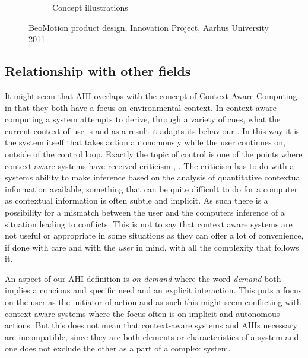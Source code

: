 \begin{figure}
\begin{subfigure}{.54\textwidth}
		\caption{Concept illustrations}
	\end{subfigure}
	\caption{BeoMotion product design, Innovation Project, Aarhus University 2011}
	\label{fig:ch:adhoc:beomotion}
\end{figure}

\subsection{Relationship with other fields} 
It might seem that AHI overlaps with the concept of Context Aware Computing in that they both have a focus on environmental context.
In context aware computing a system attempts to derive, through a variety of cues, what the current context of use is and as a result it adapts its behaviour \citep[chap. 8]{krumm2009ubiquitous}. 
In this way it is the system itself that takes action autonomously while the user continues on, outside of the control loop.
Exactly the topic of control is one of the points where context aware systems have received criticism \cite{erickson2002some}, \citep[chap. 8]{krumm2009ubiquitous}.
The criticism has to do with a systems ability to make inference based on the analysis of quantitative contextual information available, something that can be quite difficult to do for a computer as contextual information is often subtle and implicit.
As such there is a possibility for a mismatch between the user and the computers inference of a situation leading to conflicts.
This is not to say that context aware systems are not useful or appropriate in some situations as they can offer a lot of convenience, if done with care and with the \emph{user} in mind, with all the complexity that follows it.

An aspect of our AHI definition is \emph{on-demand} where the word \emph{demand} both implies a concious and specific need and an explicit interaction.
This puts a focus on the user as the initiator of action and as such this might seem conflicting with context aware systems where the focus often is on implicit and autonomous actions.
But this does not mean that context-aware systems and AHIs necessary are incompatible, since they are both elements or characteristics of a system and one does not exclude the other as a part of a complex system.

